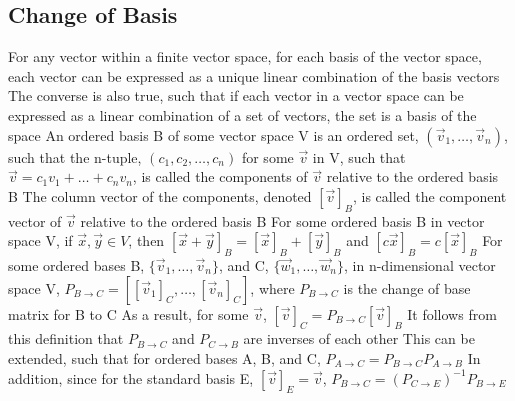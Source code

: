 \documentclass[11 pt, twoside]{article}
\newenvironment{outline*}
{
	\begin{outline}[enumerate]
	}
	{\end{outline}
}
\begin{document}
\subsection{Change of Basis}
\begin{outline*}
\1 For any vector within a finite vector space, for each basis of the vector space, each vector can be expressed as a unique linear combination of the basis vectors
\2 The converse is also true, such that if each vector in a vector space can be expressed as a linear combination of a set of vectors, the set is a basis of the space
\1 An ordered basis B of some vector space V is an ordered set, $(\vec{v}_1, \dots, \vec{v}_n)$, such that the n-tuple, $(c_1, c_2, \dots, c_n)$ for some $\vec{v}$ in V, such that $\vec{v} = c_1v_1 + \dots + c_nv_n$, is called the components of $\vec{v}$ relative to the ordered basis B
\2 The column vector of the components, denoted $[\vec{v}]_B$, is called the component vector of  $\vec{v}$ relative to the ordered basis B
\1 For some ordered basis B in vector space V, if $\vec{x}, \vec{y} \in V$, then $[\vec{x} + \vec{y}]_B = [\vec{x}]_B + [\vec{y}]_B$ and $[c\vec{x}]_B = c[\vec{x}]_B$
\1 For some ordered bases B, $\{\vec{v}_1, \dots, \vec{v}_n\}$, and C, $\{\vec{w}_1, \dots, \vec{w}_n\}$, in n-dimensional vector space V, $P_{B \to C} = [[\vec{v}_1]_C, \dots, [\vec{v}_n]_C]$, where $P_{B \to C}$ is the change of base matrix for B to C
\2 As a result, for some $\vec{v}$, $[\vec{v}]_C = P_{B \to C}[\vec{v}]_B$
\2 It follows from this definition that $P_{B \to C}$ and $P_{C \to B}$ are inverses of each other
\3 This can be extended, such that for ordered bases A, B, and C, $P_{A \to C} = P_{B \to C}P_{A \to B}$
\3 In addition, since for the standard basis E, $[\vec{v}]_E = \vec{v}$, $P_{B \to C} = (P_{C \to E})^{-1}P_{B \to E}$
\end{outline*}
\end{document}
